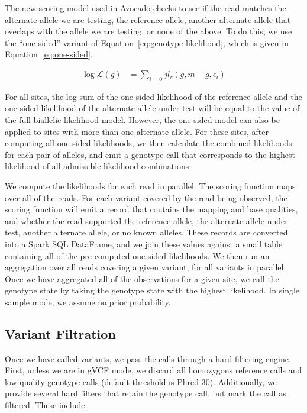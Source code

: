 \documentclass[phd]{ucbthesis}
\begin{document}
The new scoring model used in {Avocado} checks to see if the read matches
the alternate allele we are testing, the reference allele, another alternate
allele that overlaps with the allele we are testing, or none of the above. 
To do this, we use the ``one sided'' variant of
Equation~\eqref{eq:genotype-likelihood}, which is given in
Equation~\eqref{eq:one-sided}.

\begin{align}
\label{eq:one-sided}
\log \mathcal{L}(g) &= \sum_{i = 0}{j} l_r(g, m - g, \epsilon_i)
\end{align}

For all sites, the log sum of the one-sided likelihood of the reference allele
and the one-sided likelihood of the alternate allele under test will be equal to
the value of the full biallelic likelihood model. However, the one-sided model
can also be applied to sites with more than one alternate allele. For these
sites, after computing all one-sided likelihoods, we then calculate the combined
likelihoods for each pair of alleles, and emit a genotype call that corresponds
to the highest likelihood of all admissible likelihood combinations.

We compute the likelihoods for each read in parallel. The scoring function maps
over all of the reads. For each variant covered by the read being observed, the
scoring function will emit a record that contains the mapping and base
qualities, and whether the read supported the reference allele, the alternate
allele under test, another alternate allele, or no known alleles. These records
are converted into a {Spark SQL} DataFrame, and we join these values
against a small table containing all of the pre-computed one-sided likelihoods.
We then run an aggregation over all reads covering a given variant, for all
variants in parallel. Once we have aggregated all of the observations for a given
site, we call the genotype state by taking the genotype state with the highest
likelihood. In single sample mode, we assume no prior probability.

\subsection{Variant Filtration}
\label{sec:variant-filtration}

Once we have called variants, we pass the calls through a hard filtering engine.
First, unless we are in gVCF mode, we discard all homozygous reference calls and
low quality genotype calls (default threshold is Phred 30). Additionally, we
provide several hard filters that retain the genotype call, but mark the call as
filtered. These include:
\end{document}

